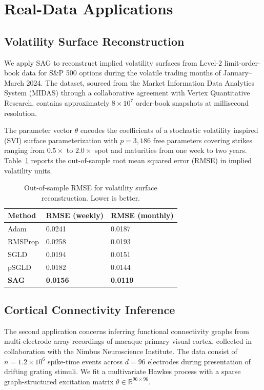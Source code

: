 \section{Real-Data Applications}

\subsection{Volatility Surface Reconstruction}

We apply SAG to reconstruct implied volatility surfaces from Level-2 limit-order-book data for S\&P 500 options during the volatile trading months of January--March 2024. The dataset, sourced from the Market Information Data Analytics System (MIDAS) through a collaborative agreement with Vertex Quantitative Research, contains approximately $8\times 10^{7}$ order-book snapshots at millisecond resolution.

The parameter vector $\theta$ encodes the coefficients of a stochastic volatility inspired (SVI) surface parameterization with $p = 3{,}186$ free parameters covering strikes ranging from $0.5\times$ to $2.0\times$ spot and maturities from one week to two years. Table~\ref{tab:vol} reports the out-of-sample root mean squared error (RMSE) in implied volatility units.

\begin{table}[htbp]
\centering
\caption{Out-of-sample RMSE for volatility surface reconstruction. Lower is better.}
\label{tab:vol}
\begin{tabularx}{0.80\textwidth}{lXX}
\toprule
\textbf{Method} & \textbf{RMSE (weekly)} & \textbf{RMSE (monthly)} \\
\midrule
Adam & 0.0241 & 0.0187 \\
RMSProp & 0.0258 & 0.0193 \\
SGLD & 0.0194 & 0.0151 \\
pSGLD & 0.0182 & 0.0144 \\
\textbf{SAG} & \textbf{0.0156} & \textbf{0.0119} \\
\bottomrule
\end{tabularx}
\end{table}

\subsection{Cortical Connectivity Inference}

The second application concerns inferring functional connectivity graphs from multi-electrode array recordings of macaque primary visual cortex, collected in collaboration with the Nimbus Neuroscience Institute. The data consist of $n = 1.2 \times 10^{6}$ spike-time events across $d = 96$ electrodes during presentation of drifting grating stimuli. We fit a multivariate Hawkes process with a sparse graph-structured excitation matrix $\theta \in \mathbb{R}^{96 \times 96}$.

